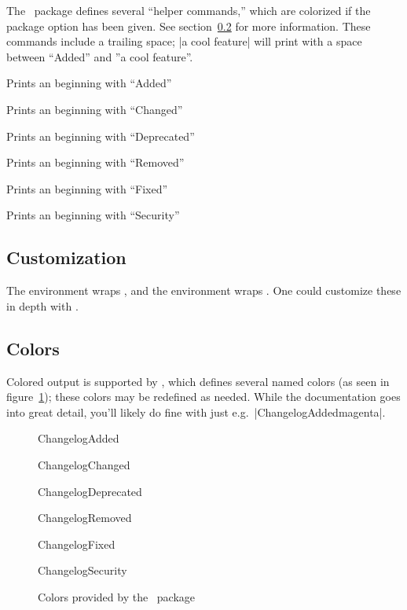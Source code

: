\documentclass{ltxdoc}
\begin{document}
The \cl\ package defines several ``helper commands,'' which are colorized if
the  package option has been given. See
section~\ref{sec:colors} for more information. These commands include a
trailing space; |\added a cool feature| will print with a space between
``Added'' and ''a cool feature''.

\begin{macro}{\added}Prints an  beginning with ``Added''\end{macro}
\begin{macro}{\changed}Prints an  beginning with ``Changed''\end{macro}
\begin{macro}{\deprecated}Prints an  beginning with ``Deprecated''\end{macro}
\begin{macro}{\removed}Prints an  beginning with ``Removed''\end{macro}
\begin{macro}{\fixed}Prints an  beginning with ``Fixed''\end{macro}
\begin{macro}{\security}Prints an  beginning with ``Security''\end{macro}

\subsection{Customization}

The  environment wraps , and the
 environment wraps . One could customize these in
depth with .

\subsection{Colors}%
\label{sec:colors}

Colored output is supported by , which defines several named
colors (as seen in figure~\ref{fig:colors}); these colors may be redefined
as needed. While the  documentation goes into great detail,
you'll likely do fine with just e.g.\ |{ChangelogAdded}{magenta}|.

\begin{figure}[h]
	\centering
	\begin{adjustwidth}{1in}{1in}
	\begin{colorlist}
		\item{ChangelogAdded}
		\item{ChangelogChanged}
		\item{ChangelogDeprecated}
		\item{ChangelogRemoved}
		\item{ChangelogFixed}
		\item{ChangelogSecurity}
	\end{colorlist}
	\end{adjustwidth}
	\caption{Colors provided by the \cl\ package}
	\label{fig:colors}
\end{figure}
\end{document}
